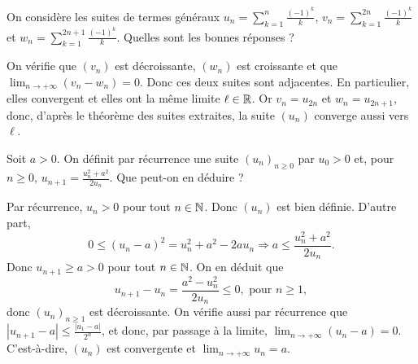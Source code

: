 \begin{question}

On considère les suites de termes généraux $\displaystyle u_n=\sum _{k=1}^n\frac{(-1)^k}{k}$, $\displaystyle v_n=\sum _{k=1}^{2n}\frac{(-1)^k}{k}$ et $\displaystyle w_n=\sum _{k=1}^{2n+1}\frac{(-1)^k}{k}$. Quelles sont les bonnes réponses ?
\begin{answers}  
\end{answers}
\begin{explanations}
On vérifie que $(v_n)$ est décroissante, $(w_n)$ est croissante et que $\displaystyle \lim _{n\to +\infty}(v_n-w_n)=0$. Donc ces deux suites sont adjacentes. En particulier, elles convergent et elles ont la même limite $\ell \in \mathbb{R}$. Or $v_n=u_{2n}$ et $w_n=u_{2n+1}$, donc, d'après le théorème des suites extraites, la suite $(u_n)$ converge aussi vers $\displaystyle \ell$.
\end{explanations}
\end{question}


\begin{question}

Soit $a>0$. On définit par récurrence une suite $(u_n)_{n\geq 0}$ par $u_0>0$ et, pour $n\geq 0$, $\displaystyle u_{n+1}= \frac{u_n^2+a^2}{2u_n}$. Que peut-on en déduire ?
\begin{answers}  
\end{answers}
\begin{explanations}
Par récurrence, $u_n>0$ pour tout $n\in \mathbb{N}$. Donc $(u_n)$ est bien définie. D'autre part, 
$$\displaystyle 0\leq (u_n-a)^2=u_n^2+a^2-2au_n \Rightarrow  a\leq \frac{u_n^2+a^2}{2u_n}.$$
Donc $u_{n+1}\geq a>0$ pour tout $n\in \mathbb{N}$. On en déduit que
$$\displaystyle u_{n+1}-u_n=\frac{a^2-u_n^2}{2u_n}\leq 0,\mbox{ pour }n\geq 1,$$
donc $(u_n)_{n\geq 1}$ est décroissante. On vérifie aussi par récurrence que $\displaystyle \left|u_{n+1}-a\right|\leq \frac{\left|u_1-a\right|}{2^n}$, et donc, par passage à la limite, $\displaystyle \lim _{n\to +\infty}(u_n-a)=0$. C'est-à-dire, $(u_n)$ est convergente et $\displaystyle \lim _{n\to +\infty}u_n=a$.
\end{explanations}
\end{question}



